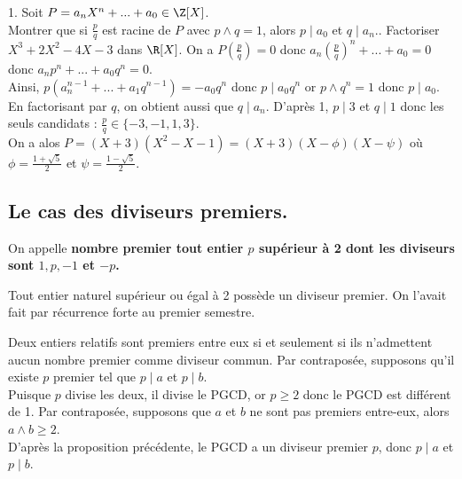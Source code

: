 \documentclass[11pt]{article}
\begin{document}
\begin{ex}{}{}
    1. Soit $P=a_nX^n+...+a_0\in\Z[X]$.\\
    Montrer que si $\frac{p}{q}$ est racine de $P$ avec $p\land q=1$, alors $p\mid a_0$ et $q\mid a_n$.. Factoriser $X^3+2X^2-4X-3$ dans $\R[X]$.
    \tcblower
     On a $P(\frac{p}{q})=0$ donc $a_n\left(\frac{p}{q}\right)^n+...+a_0=0$ donc $a_np^n+...+a_0q^n=0$.\\
    Ainsi, $p(a_n^{n-1}+...+a_1q^{n-1})=-a_0q^n$ donc $p\mid a_0q^n$ or $p\land q^n=1$ donc $p\mid a_0$.\\
    En factorisant par $q$, on obtient aussi que $q\mid a_n$.\n
     D'après 1, $p\mid3$ et $q\mid1$ donc les seuls candidats : $\frac{p}{q}\in\{-3,-1,1,3\}$.\\
    On a alos $P=(X+3)(X^2-X-1)=(X+3)(X-\phi)(X-\psi)$ où $\phi=\frac{1+\sqrt{5}}{2}$ et $\psi=\frac{1-\sqrt{5}}{2}$.
\end{ex}

\subsection{Le cas des diviseurs premiers.}

\begin{defi}{}{}
    On appelle \bf{nombre premier} tout entier $p$ supérieur à 2 dont les diviseurs sont $1,p,-1$ et $-p$.
\end{defi}

\begin{prop}{}{}
    Tout entier naturel supérieur ou égal à 2 possède un diviseur premier.
    \tcblower
    On l'avait fait par récurrence forte au premier semestre.
\end{prop}

\begin{prop}{}{}
    Deux entiers relatifs sont premiers entre eux si et seulement si ils n'admettent aucun nombre premier comme diviseur commun.
    \tcblower
    \fbox{$\ra$} Par contraposée, supposons qu'il existe $p$ premier tel que $p\mid a$ et $p\mid b$.\\
    Puisque $p$ divise les deux, il divise le PGCD, or $p\geq2$ donc le PGCD est différent de 1.\n
    \fbox{$\la$} Par contraposée, supposons que $a$ et $b$ ne sont pas premiers entre-eux, alors $a\land b\geq2$.\\
    D'après la proposition précédente, le PGCD a un diviseur premier $p$, donc $p\mid a$ et $p\mid b$.
\end{prop}
\end{document}
